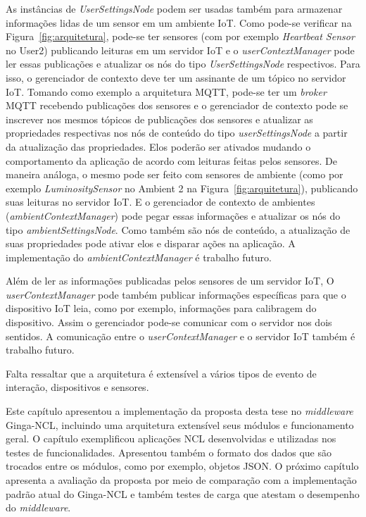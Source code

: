 As instâncias de \textit{UserSettingsNode} podem ser usadas também para armazenar informações lidas de um sensor em um ambiente IoT. Como pode-se verificar na Figura~\ref{fig:arquitetura}, pode-se ter sensores (com por exemplo \textit{Heartbeat Sensor} no User2) publicando leituras em um servidor IoT e o \textit{userContextManager} pode ler essas publicações e atualizar os nós do tipo \textit{UserSettingsNode} respectivos. Para isso, o gerenciador de contexto deve ter um assinante de um tópico no servidor IoT. Tomando como exemplo a arquitetura MQTT, pode-se ter um \textit{broker} MQTT recebendo publicações dos sensores e o gerenciador de contexto pode se inscrever nos mesmos tópicos de publicações dos sensores e atualizar as propriedades respectivas nos nós de conteúdo do tipo \textit{userSettingsNode} a partir da atualização das propriedades. Elos poderão ser ativados mudando o comportamento da aplicação de acordo com leituras feitas pelos sensores. De maneira análoga, o mesmo pode ser feito com sensores de ambiente (como por exemplo \textit{LuminositySensor} no Ambient 2 na Figura~\ref{fig:arquitetura}), publicando suas leituras no servidor IoT. E o gerenciador de contexto de ambientes (\textit{ambientContextManager}) pode pegar essas informações e atualizar os nós do tipo \textit{ambientSettingsNode}. Como também são nós de conteúdo, a atualização de suas propriedades pode ativar elos e disparar ações na aplicação. A implementação do \textit{ambientContextManager} 
é trabalho futuro.

Além de ler as informações publicadas pelos sensores de um servidor IoT, O \textit{userContextManager} pode também publicar informações específicas para que o dispositivo IoT leia, como por exemplo, informações para calibragem do dispositivo. Assim o gerenciador pode-se comunicar com o servidor nos dois sentidos. A comunicação entre o \textit{userContextManager} e o servidor IoT também 
é trabalho futuro.

Falta ressaltar que a arquitetura é extensível a vários tipos de evento de interação, dispositivos e sensores.

Este capítulo apresentou a implementação da proposta desta tese no \textit{middleware} Ginga-NCL, incluindo uma arquitetura extensível seus módulos e funcionamento geral. O capítulo exemplificou aplicações NCL desenvolvidas e utilizadas nos testes de funcionalidades. Apresentou também o formato dos dados que são trocados entre os módulos, como por exemplo, objetos JSON. O próximo capítulo apresenta a avaliação da proposta por meio de comparação com a implementação padrão atual do Ginga-NCL e também testes de carga que atestam o desempenho do \textit{middleware}.